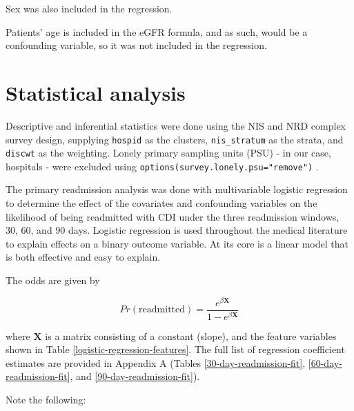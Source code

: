 \documentclass[12pt]{ociamthesis}\usepackage[]{graphicx}\usepackage[]{color}
\begin{document}
Sex was also included in the regression.

Patients' age is included in the eGFR formula, and as such, would be a confounding variable, so it was not included in the regression.

\section{Statistical analysis}

Descriptive and inferential statistics were done using the NIS and NRD complex survey design, 
supplying \texttt{hospid} as the clusters, \texttt{nis\_stratum} as the strata, and \texttt{discwt} as the weighting. 
Lonely primary sampling units (PSU) - in our case, hospitals - were excluded using \texttt{options(survey.lonely.psu="remove")} \cite{LonelyPSUs}.

The primary readmission analysis was done with multivariable logistic regression to determine the effect of the covariates and confounding variables
on the likelihood of being readmitted with CDI under the three readmission windows, 30, 60, and 90 days. Logistic regression is used throughout
the medical literature to explain effects on a binary outcome variable. At its core is a linear model that is both effective and easy to explain. 

The odds are given by

\begin{equation} \label{logistic}
    Pr(\text{readmitted}) = \frac{e^{\beta \mathbf{X}}}{1 - e^{\beta \mathbf{X}}}
\end{equation}

where $\mathbf{X}$ is a matrix consisting of a constant (slope), and the feature variables shown in Table \ref{logistic-regression-features}.
The full list of regression coefficient estimates are provided in Appendix A
(Tables \ref{30-day-readmission-fit}, \ref{60-day-readmission-fit}, and \ref{90-day-readmission-fit}).


Note the following:
\end{document}
